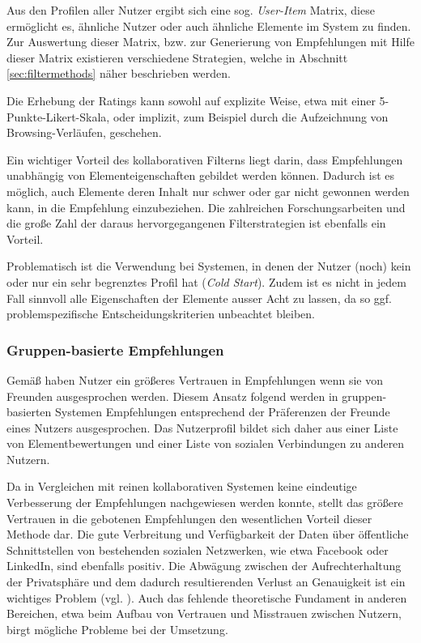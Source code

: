 Aus den Profilen aller Nutzer ergibt sich eine sog. \textit{User-Item} Matrix, diese ermöglicht es, ähnliche Nutzer oder auch ähnliche Elemente im System zu finden. Zur Auswertung dieser Matrix, bzw. zur Generierung von Empfehlungen mit Hilfe dieser Matrix existieren verschiedene Strategien, welche in Abschnitt \ref{sec:filtermethods} näher beschrieben werden.

Die Erhebung der Ratings kann sowohl auf explizite Weise, etwa mit einer 5-Punkte-Likert-Skala, oder implizit, zum Beispiel durch die Aufzeichnung von Browsing-Verläufen, geschehen.

Ein wichtiger Vorteil des kollaborativen Filterns liegt darin, dass Empfehlungen unabhängig von Elementeigenschaften gebildet werden können. Dadurch ist es möglich, auch Elemente deren Inhalt nur schwer oder gar nicht gewonnen werden kann, in die Empfehlung einzubeziehen. Die zahlreichen Forschungsarbeiten und die große Zahl der daraus hervorgegangenen Filterstrategien ist ebenfalls ein Vorteil.

Problematisch ist die Verwendung bei Systemen, in denen der Nutzer (noch) kein oder nur ein sehr begrenztes Profil hat (\textit{Cold Start}). Zudem ist es nicht in jedem Fall sinnvoll alle Eigenschaften der Elemente ausser Acht zu lassen, da so ggf. problemspezifische Entscheidungskriterien unbeachtet bleiben.  \citep{hb,Burke:2002:HRS:586321.586352} %

\subsubsection{Gruppen-basierte Empfehlungen}\label{sec:cbf_overview}
Gemäß \citep{SinhaS01} haben Nutzer ein größeres Vertrauen in Empfehlungen wenn sie von Freunden ausgesprochen werden. Diesem Ansatz folgend werden in gruppen-basierten Systemen Empfehlungen entsprechend der Präferenzen der Freunde eines Nutzers ausgesprochen. Das Nutzerprofil bildet sich daher aus einer Liste von Elementbewertungen und einer Liste von sozialen Verbindungen zu anderen Nutzern.

Da in Vergleichen mit reinen kollaborativen Systemen keine eindeutige Verbesserung der Empfehlungen nachgewiesen werden konnte, stellt das größere Vertrauen in die gebotenen Empfehlungen den wesentlichen Vorteil dieser Methode dar. Die gute Verbreitung und Verfügbarkeit der Daten über öffentliche Schnittstellen von  bestehenden sozialen Netzwerken, wie etwa Facebook oder LinkedIn, sind ebenfalls positiv. Die Abwägung zwischen der Aufrechterhaltung der Privatsphäre und dem dadurch resultierenden Verlust an Genauigkeit ist ein wichtiges Problem (vgl. \citep{machanavajjhala:accurate}). Auch das fehlende theoretische Fundament in anderen Bereichen, etwa beim Aufbau von Vertrauen und Misstrauen zwischen Nutzern, birgt mögliche Probleme bei der Umsetzung. \citep{hb_20}

